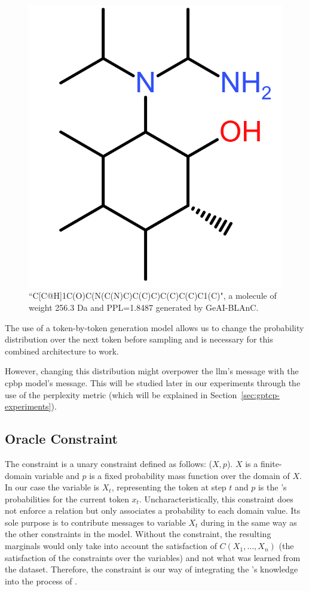 \documentclass[../Document.tex]{subfiles}
\begin{document}
\begin{figure}[t]
    \centering
    \includegraphics[width=0.25\columnwidth]
    {images/example_molecule.png}
    \caption{``C[C@H]1C(O)C(N(C(N)C)C(C)C)C(C)C(C)C1(C)", a molecule of weight  256.3 Da and PPL=1.8487
    generated by GeAI-BLAnC.} %
    \label{fig:combined-model-molecule}
\end{figure}

The use of a token-by-token generation model allows us to change the probability distribution over the next token before sampling and is necessary for this combined architecture to work.

However, changing this distribution might overpower the \gls{llm}'s message with the \gls{cpbp} model's message. This will be studied later in our experiments through the use of the perplexity metric (which will be explained in Section~\ref{sec:gptcp-experiments}).


\subsection{Oracle Constraint}
\label{sec:oracle-constraint}
The \oracle constraint is a unary constraint defined as follows: \oracle($X,p$). $X$ is a finite-domain variable and $p$ is a fixed probability mass function over the domain of $X$.
In our case the variable is $X_t$, representing the token at step $t$ and $p$ is the \nn's probabilities for the current token $x_t$.
Uncharacteristically, this constraint does not enforce a relation but only associates a probability to each domain value.
Its sole purpose is to contribute messages to variable $X_t$ during \bp in the same way as the other constraints in the \cp model.
Without the \oracle constraint, the resulting marginals would only take into account the satisfaction of $C(X_1,\ldots,X_n)$ (\ie the satisfaction of the constraints over the variables) and not what was learned from the dataset.
Therefore, the \oracle constraint is our way of integrating the \nn's knowledge into the process of \cpbp.
\end{document}
